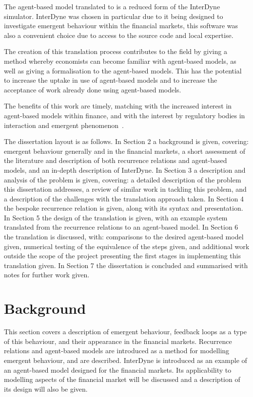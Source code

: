 \documentclass{article}
\begin{document}
The agent-based model translated to is a reduced form of the InterDyne simulator. InterDyne was chosen in particular due to it being designed to investigate emergent behaviour within the financial markets, this software was also a convenient choice due to access to the source code and local expertise.   

The creation of this translation process contributes to the field by giving a method whereby economists can become familiar with agent-based models, as well as giving a formalisation to the agent-based models. This has the potential to increase the uptake in use of agent-based models and to increase the acceptance of work already done using agent-based models. 

The benefits of this work are timely, matching with the increased interest in agent-based models within finance, and with the interest by regulatory bodies in interaction and emergent phenomenon~\cite{fallacyofcompostionBook, newwork1, newabmpaper}.  

The dissertation layout is as follows. In Section 2 a background is given, covering: emergent behaviour generally and in the financial markets, a short assessment of the literature and description of both recurrence relations and agent-based models, and an in-depth description of InterDyne. In Section 3 a description and analysis of the problem is given, covering: a detailed description of the problem this dissertation addresses, a review of similar work in tackling this problem, and a description of the challenges with the translation approach taken. In Section 4 the bespoke recurrence relation is given, along with its syntax and presentation. In Section 5 the design of the translation is given, with an example system translated from the recurrence relations to an agent-based model. In Section 6 the translation is discussed, with: comparisons to the desired agent-based model given, numerical testing of the equivalence of the steps given, and additional work outside the scope of the project presenting the first stages in implementing this translation given. In Section 7 the dissertation is concluded and summarised with notes for further work given.     







\newpage
\section{Background}
This section covers a description of emergent behaviour, feedback loops as a type of this behaviour, and their appearance in the financial markets. Recurrence relations and agent-based models are introduced as a method for modelling emergent behaviour, and are described. InterDyne is introduced as an example of an agent-based model designed for the financial markets. Its applicability to modelling aspects of the financial market will be discussed and a description of its design will also be given.   
\end{document}
